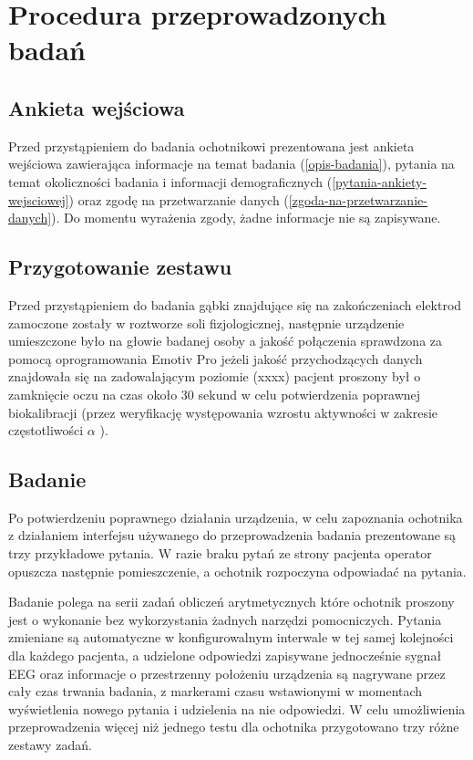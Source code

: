 \documentclass{./assets/wfis}
\begin{document}
\section{Procedura przeprowadzonych badań}\label{procedura-badan}
\subsection{Ankieta wejściowa}
Przed przystąpieniem do badania ochotnikowi prezentowana jest ankieta wejściowa zawierająca informacje na temat badania (\autoref{opis-badania}), pytania na temat okoliczności badania i informacji demograficznych (\autoref{pytania-ankiety-wejsciowej}) oraz zgodę na przetwarzanie danych (\autoref{zgoda-na-przetwarzanie-danych}). Do momentu wyrażenia zgody, żadne informacje nie są zapisywane.

\subsection{Przygotowanie zestawu}
Przed przystąpieniem do badania gąbki znajdujące się na zakończeniach elektrod zamoczone zostały w roztworze soli fizjologicznej, następnie urządzenie umieszczone było na głowie badanej osoby a jakość połączenia sprawdzona za pomocą oprogramowania Emotiv Pro \cite{emotiv_inc_epoc_nodate} jeżeli jakość przychodzących danych znajdowała się na zadowalającym poziomie (xxxx) pacjent proszony był o zamknięcie oczu na czas około 30 sekund w celu potwierdzenia poprawnej biokalibracji (przez weryfikację występowania wzrostu aktywności w zakresie częstotliwości $\alpha$ \cite{britton_electroencephalography_2016}).

\subsection{Badanie}
Po potwierdzeniu poprawnego działania urządzenia, w celu zapoznania ochotnika z działaniem interfejsu używanego do przeprowadzenia badania prezentowane są trzy przykładowe pytania. W razie braku pytań ze strony pacjenta operator opuszcza następnie pomieszczenie, a ochotnik rozpoczyna odpowiadać na pytania.

Badanie polega na serii zadań obliczeń arytmetycznych które ochotnik proszony jest o wykonanie bez wykorzystania żadnych narzędzi pomocniczych. Pytania zmieniane są automatyczne w konfigurowalnym interwale w tej samej kolejności dla każdego pacjenta, a udzielone odpowiedzi zapisywane jednocześnie sygnał EEG oraz informacje o przestrzenny położeniu urządzenia są nagrywane przez cały czas trwania badania, z markerami czasu wstawionymi w momentach wyświetlenia nowego pytania i udzielenia na nie odpowiedzi. W celu umożliwienia przeprowadzenia więcej niż jednego testu dla ochotnika przygotowano trzy różne zestawy zadań.
\end{document}

